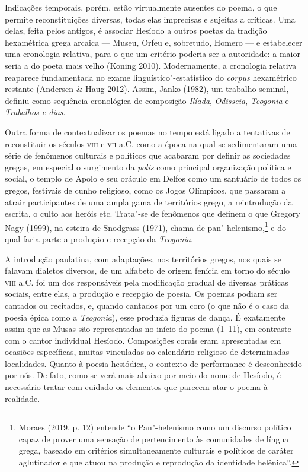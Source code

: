 Indicações temporais, porém, estão virtualmente ausentes do poema, o que
permite reconstituições diversas, todas elas imprecisas e sujeitas a
críticas. Uma delas, feita pelos antigos, é associar Hesíodo a outros
poetas da tradição hexamétrica grega arcaica --- Museu, Orfeu e,
sobretudo, Homero --- e estabelecer uma cronologia relativa, para o que
um critério poderia ser a autoridade: a maior seria a do poeta mais
velho (Koning 2010). Modernamente, a cronologia relativa reaparece
fundamentada no exame linguístico"-estatístico do \emph{corpus}
hexamétrico restante (Andersen \& Haug 2012). Assim, Janko (1982), um
trabalho seminal, definiu como sequência cronológica de composição
\emph{Ilíada}, \emph{Odisseia}, \emph{Teogonia} e \emph{Trabalhos e
dias}.

Outra forma de contextualizar os poemas no tempo está ligado a
tentativas de reconstituir os séculos \textsc{viii} e \textsc{vii} a.C. como a época na
qual se sedimentaram uma série de fenômenos culturais e políticos que
acabaram por definir as sociedades gregas, em especial o surgimento da
\emph{polis} como principal organização política e social, o templo de
Apolo e seu oráculo em Delfos como um santuário de todos os gregos,
festivais de cunho religioso, como os Jogos Olímpicos, que passaram a
atrair participantes de uma ampla gama de territórios grego, a
reintrodução da escrita, o culto aos heróis etc. Trata"-se de fenômenos
que definem o que Gregory Nagy (1999), na esteira de Snodgrass (1971),
chama de pan"-helenismo,\footnote{Moraes (2019, p. 12) entende ``o
  Pan"-helenismo como um discurso político capaz de prover uma sensação
  de pertencimento às comunidades de língua grega, baseado em critérios
  simultaneamente culturais e políticos de caráter aglutinador e que
  atuou na produção e reprodução da identidade helênica''.} e do qual
faria parte a produção e recepção da \emph{Teogonia}.

A introdução paulatina, com adaptações, nos territórios gregos, nos
quais se falavam dialetos diversos, de um alfabeto de origem fenícia em
torno do século \textsc{viii} a.C. foi um dos responsáveis pela modificação
gradual de diversas práticas sociais, entre elas, a produção e recepção
de poesia. Os poemas podiam ser cantados ou recitados, e, quando
cantados por um coro (o que não é o caso da poesia épica como a
\emph{Teogonia}), esse produzia figuras de dança. É exatamente assim que
as Musas são representadas no início do poema (1--11), em contraste com o
cantor individual Hesíodo. Composições corais eram apresentadas em
ocasiões específicas, muitas vinculadas ao calendário religioso de
determinadas localidades. Quanto à poesia hesiódica, o contexto de
performance é desconhecido por nós. De fato, como se verá mais abaixo
por meio do nome de Hesíodo, é necessário tratar com cuidado os
elementos que parecem atar o poema à realidade.


